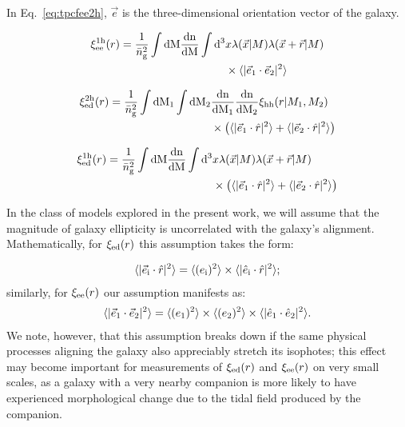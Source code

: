 \documentclass[fleqn,usenatbib]{mnras}
\newcommand{\tpcf}[1]{\xi_{\rm #1}}
\newcommand{\tpcftwo}[2]{\xi_{\rm #1}^{\rm #2}}
\newcommand{\evec}[1]{\vec{e}_{\rm #1}}
\newcommand{\evechat}[1]{\hat{e}_{\rm #1}}
\newcommand{\dd}{\rm d}
\newcommand{\mean}[1]{\langle #1 \rangle}
\begin{document}
In Eq.~\ref{eq:tpcfee2h}, $\vec{e}$ is the three-dimensional orientation vector of the galaxy. 

\begin{align}
\begin{split}
\tpcftwo{ee}{1h}(r) =  \frac{1}{\bar{n}_{\rm g}^{2}} \int\dd M \frac{\rm dn}{\dd M} \int\dd^{3}& x\lambda(\vec{x}\vert M)\lambda(\vec{x}+\vec{r}\vert M)\\ & \times  \mean{\vert\evec{1}\cdot\evec{2}\vert^{2}}
\end{split}
\end{align}

\begin{align}
\begin{split}
\tpcftwo{ed}{2h}(r) =   \frac{1}{\bar{n}_{\rm g}^{2}}\int\dd M_1 \int\dd M_2 & \frac{\rm dn}{\dd M_1}\frac{\rm dn}{\dd M_2} \tpcf{hh}(r\vert M_1, M_2) \\& \times \left( \mean{\vert\evec{1}\cdot\hat{r}\vert^{2}} +  \mean{\vert\evec{2}\cdot\hat{r}\vert^{2}} \right)
\end{split}
\end{align}

\begin{align}
\begin{split}
\tpcftwo{ed}{1h}(r) =  \frac{1}{\bar{n}_{\rm g}^{2}} \int\dd M \frac{\rm dn}{\dd M} \int\dd^{3}& x\lambda(\vec{x}\vert M)\lambda(\vec{x}+\vec{r}\vert M)\\ & \times \left(  \mean{\vert\evec{1}\cdot\hat{r}\vert^{2}} + \mean{\vert\evec{2}\cdot\hat{r}\vert^{2}} \right)
\end{split}
\end{align}

In the class of models explored in the present work, we will assume that the magnitude of galaxy ellipticity is uncorrelated with the galaxy's alignment. Mathematically, for $\tpcf{ed}(r)$ this assumption takes the form:

\begin{align}
\label{eq:uncorrelated_ellipticity_ed}
 \mean{\vert\evec{i}\cdot\hat{r}\vert^{2}} =  \mean{(e_{\rm i})^{2}}\times\mean{\vert\evechat{i}\cdot\hat{r}\vert^{2}};
\end{align}
similarly, for $\tpcf{ee}(r)$ our assumption manifests as:  
\begin{align}
\label{eq:uncorrelated_ellipticity_ee}
\mean{\vert\evec{1}\cdot\evec{2}\vert^{2}} =  \mean{(e_{1})^{2}}\times\mean{(e_{2})^{2}}\times\mean{\vert\evechat{1}\cdot\evechat{2}\vert^{2}}.
\end{align}
We note, however, that this assumption breaks down if the same physical processes aligning the galaxy also appreciably stretch its isophotes; this effect may become important for measurements of $\tpcf{ed}(r)$ and $\tpcf{ee}(r)$ on very small scales, as a galaxy with a very nearby companion is more likely to have experienced morphological change due to the tidal field produced by the companion. 
\end{document}
